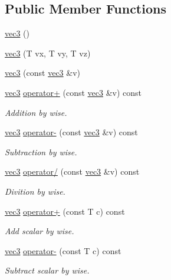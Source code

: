 \subsection*{Public Member Functions}
\begin{DoxyCompactItemize}
\item 
\mbox{\hyperlink{structvec3_afb7342872bc442bf0da6a7da1671e77e}{vec3}} ()
\item 
\mbox{\hyperlink{structvec3_a9cdcc79d7383d2676ae1f5701c481607}{vec3}} (T vx, T vy, T vz)
\item 
\mbox{\hyperlink{structvec3_ac0d73cf98ccc9b3cb39e6f58e92dab9f}{vec3}} (const \mbox{\hyperlink{structvec3}{vec3}} \&v)
\item 
\mbox{\hyperlink{structvec3}{vec3}} \mbox{\hyperlink{structvec3_a255037f59863e54390e388dd07e7ee8f}{operator+}} (const \mbox{\hyperlink{structvec3}{vec3}} \&v) const
\begin{DoxyCompactList}\small\item\em Addition by wise. \end{DoxyCompactList}\item 
\mbox{\hyperlink{structvec3}{vec3}} \mbox{\hyperlink{structvec3_a62ca43535073d9711fe179e26a412e32}{operator-\/}} (const \mbox{\hyperlink{structvec3}{vec3}} \&v) const
\begin{DoxyCompactList}\small\item\em Subtraction by wise. \end{DoxyCompactList}\item 
\mbox{\hyperlink{structvec3}{vec3}} \mbox{\hyperlink{structvec3_ad2f8afc304554e7b5d7331030e8bc91d}{operator/}} (const \mbox{\hyperlink{structvec3}{vec3}} \&v) const
\begin{DoxyCompactList}\small\item\em Divition by wise. \end{DoxyCompactList}\item 
\mbox{\hyperlink{structvec3}{vec3}} \mbox{\hyperlink{structvec3_a1b9727670ffa0a403e628bfdc966da45}{operator+}} (const T c) const
\begin{DoxyCompactList}\small\item\em Add scalar by wise. \end{DoxyCompactList}\item 
\mbox{\hyperlink{structvec3}{vec3}} \mbox{\hyperlink{structvec3_a4c45d24dd69ba07e484e2951933d2f97}{operator-\/}} (const T c) const
\begin{DoxyCompactList}\small\item\em Subtract scalar by wise. \end{DoxyCompactList}\item 

\end{DoxyCompactItemize}
